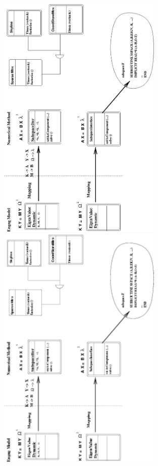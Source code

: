 \documentclass[a4paper]{article}
\begin{document}
\begin{figure}[tb]
\begin{htmlonly}
  \centerline{\includegraphics[width=0.7\textwidth]{engng.eps}}
\end{htmlonly}
\ifpdf
\centerline{\includegraphics[angle=270,width=0.7\textwidth]{engng.pdf}}

\end{figure}
\end{document}
